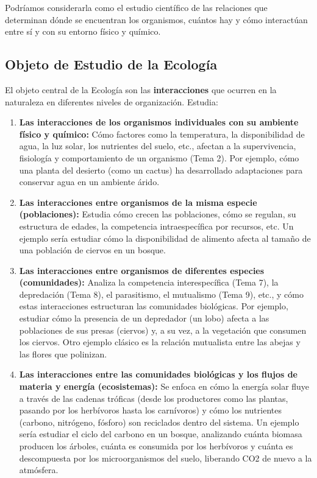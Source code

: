 \documentclass[
]{book}
\begin{document}
Podríamos considerarla como el estudio científico de las relaciones que determinan dónde se encuentran los organismos, cuántos hay y cómo interactúan entre sí y con su entorno físico y químico.

\subsection*{\texorpdfstring{\textbf{Objeto de Estudio de la Ecología}}{Objeto de Estudio de la Ecología}}\label{objestud}

El objeto central de la Ecología son las \textbf{interacciones} que ocurren en la naturaleza en diferentes niveles de organización. Estudia:

\begin{enumerate}
\def\labelenumi{\arabic{enumi}.}
\item
  \textbf{Las interacciones de los organismos individuales con su ambiente físico y químico:} Cómo factores como la temperatura, la disponibilidad de agua, la luz solar, los nutrientes del suelo, etc., afectan a la supervivencia, fisiología y comportamiento de un organismo (Tema 2). Por ejemplo, cómo una planta del desierto (como un cactus) ha desarrollado adaptaciones para conservar agua en un ambiente árido.
\item
  \textbf{Las interacciones entre organismos de la misma especie (poblaciones):} Estudia cómo crecen las poblaciones, cómo se regulan, su estructura de edades, la competencia intraespecífica por recursos, etc. Un ejemplo sería estudiar cómo la disponibilidad de alimento afecta al tamaño de una población de ciervos en un bosque.
\item
  \textbf{Las interacciones entre organismos de diferentes especies (comunidades):} Analiza la competencia interespecífica (Tema 7), la depredación (Tema 8), el parasitismo, el mutualismo (Tema 9), etc., y cómo estas interacciones estructuran las comunidades biológicas. Por ejemplo, estudiar cómo la presencia de un depredador (un lobo) afecta a las poblaciones de sus presas (ciervos) y, a su vez, a la vegetación que consumen los ciervos. Otro ejemplo clásico es la relación mutualista entre las abejas y las flores que polinizan.
\item
  \textbf{Las interacciones entre las comunidades biológicas y los flujos de materia y energía (ecosistemas):} Se enfoca en cómo la energía solar fluye a través de las cadenas tróficas (desde los productores como las plantas, pasando por los herbívoros hasta los carnívoros) y cómo los nutrientes (carbono, nitrógeno, fósforo) son reciclados dentro del sistema. Un ejemplo sería estudiar el ciclo del carbono en un bosque, analizando cuánta biomasa producen los árboles, cuánta es consumida por los herbívoros y cuánta es descompuesta por los microorganismos del suelo, liberando CO2 de nuevo a la atmósfera.

\end{enumerate}
\end{document}
